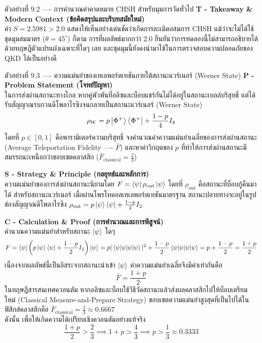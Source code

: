\begin{psctbox}{ตัวอย่างที่ 9.2 ---- การคำนวณค่าคาดหมาย CHSH สำหรับมุมการวัดทั่วไป}
\vspace{4pt}
\noindent\textbf{T - Takeaway \& Modern Context (ข้อคิดสรุปและบริบทสมัยใหม่)} \\
ค่า $S = 2.5981 > 2.0$ แสดงให้เห็นอย่างเด่นชัดว่าเกิดการละเมิดอสมการ CHSH แม้ว่าจะไม่ได้ใช้ชุดมุมสมมาตร ($\theta = 45^\circ$) ก็ตาม การที่ผลลัพธ์มากกว่า $2.0$ ยืนยันว่าการทดลองนี้ไม่สามารถอธิบายได้ด้วยทฤษฎีตัวแปรแฝงเฉพาะที่ใดๆ เลย และชุดมุมนี้ยังคงนำมาใช้ในการตรวจสอบความปลอดภัยของ QKD ได้เป็นอย่างดี
\end{psctbox}

\begin{psctbox}{ตัวอย่างที่ 9.3 ---- ความแม่นยำของเทเลพอร์ตเทชันภายใต้สถานะแวร์เนอร์ (Werner State)}
\noindent\textbf{P - Problem Statement (โจทย์ปัญหา)} \\
ในการส่งผ่านสถานะทางไกล หากคู่พัวพันที่อลิซและบ็อบแชร์กันไม่ได้อยู่ในสถานะเบลล์บริสุทธิ์ แต่ได้รับสัญญาณรบกวนดีโพลาไรซิงจนกลายเป็นสถานะแวร์เนอร์ (Werner State)
\begin{equation}
\rho_W = p \ket{\Phi^+}\bra{\Phi^+} + \frac{1-p}{4} I_4
\end{equation}
โดยที่ $p \in [0, 1]$ คือพารามิเตอร์ความบริสุทธิ์ จงคำนวณค่าความแม่นยำเฉลี่ยของการส่งผ่านสถานะ (Average Teleportation Fidelity ---- $\bar{F}$) และหาค่าวิกฤตของ $p$ ที่ทำให้การส่งผ่านสถานะมีสมรรถนะเหนือกว่าขอบเขตคลาสสิก ($\bar{F}_{\text{classical}} = \frac{2}{3}$)

\vspace{4pt}
\noindent\textbf{S - Strategy \& Principle (กลยุทธ์และหลักการ)} \\
ความแม่นยำของการส่งผ่านสถานะนิยามโดย $F = \bra{\psi}\rho_{\text{out}}\ket{\psi}$ โดยที่ $\rho_{\text{out}}$ คือสถานะที่บ็อบกู้คืนมาได้ สำหรับสถานะแวร์เนอร์ เมื่อผ่านโพรโทคอลเทเลพอร์ตเทชันมาตรฐาน สถานะปลายทางจะอยู่ในรูปช่องสัญญาณดีโพลาไรซิง $\rho_{\text{out}} = p \ket{\psi}\bra{\psi} + \frac{1-p}{2} I_2$

\vspace{4pt}
\noindent\textbf{C - Calculation \& Proof (การคำนวณและการพิสูจน์)} \\
คำนวณความแม่นยำสำหรับสถานะ $\ket{\psi}$ ใดๆ
\begin{equation}
F = \bra{\psi} \left( p \ket{\psi}\bra{\psi} + \frac{1-p}{2} I_2 \right) \ket{\psi} = p |\braket{\psi|\psi}|^2 + \frac{1-p}{2} \braket{\psi|\psi} = p + \frac{1-p}{2} = \frac{1+p}{2}
\end{equation}
เนื่องจากผลลัพธ์นี้เป็นอิสระจากสถานะนำเข้า $\ket{\psi}$ ค่าความแม่นยำเฉลี่ยจึงมีค่าเท่ากันคือ
\begin{equation}
\bar{F} = \frac{1+p}{2}
\end{equation}
ในทฤษฎีสารสนเทศควอนตัม หากอลิซและบ็อบใช้วิธีวัดสถานะแล้วส่งผลคลาสสิกไปให้บ็อบเตรียมใหม่ (Classical Measure-and-Prepare Strategy) ขอบเขตความแม่นยำสูงสุดที่เป็นไปได้ในฟิสิกส์คลาสสิกคือ $\bar{F}_{\text{classical}} = \frac{2}{3} \approx 0.6667$ \\
ดังนั้น เพื่อให้เกิดความได้เปรียบเชิงควอนตัมอย่างแท้จริง
\begin{equation}
\frac{1+p}{2} > \frac{2}{3} \implies 1+p > \frac{4}{3} \implies p > \frac{1}{3} \approx 0.3333
\end{equation}


\end{psctbox}
